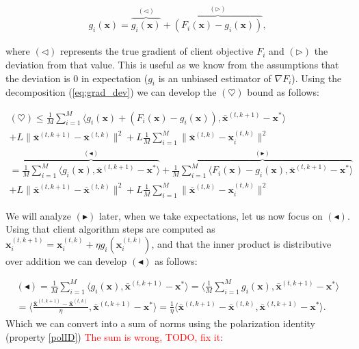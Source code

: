 \begin{align}
    g_i(\bm{x}) = \overbrace{g_i(\bm{x})}^{(\triangleleft)} + \overbrace{\left(F_i(\bm{x}) - g_i(\bm{x}) \right)}^{(\triangleright)},
    \label{eq:grad_dev}
\end{align}

where $(\triangleleft)$ represents the true gradient of client objective $F_i$ and $(\triangleright)$ the deviation from that value. This is useful as we know from the assumptions that the deviation is $0$ in expectation ($g_i$ is an unbiased estimator of $\nabla F_i$). Using the decomposition (\ref{eq:grad_dev}) we can develop the $(\heartsuit)$ bound as follows:

\begin{align*}
    (\heartsuit) \leq \frac{1}{M} \sum_{i=1}^M  \langle g_i(\bm{x})  + \left(F_i(\bm{x}) - g_i(\bm{x}) \right) ,\bar{\bm{x}}^{(t,k+1)} - \bm{x}^{*} \rangle  \\+ L  \|\bar{\bm{x}}^{(t,k+1)}-\bar{\bm{x}}^{(t,k)} \|^2  +L \frac{1}{M} \sum_{i=1}^M \|\bar{\bm{x}}^{(t,k)}-\bm{x}_i^{(t,k)} \|^2 \\
    = \overbrace{\frac{1}{M} \sum_{i=1}^M  \langle g_i(\bm{x})  ,\bar{\bm{x}}^{(t,k+1)} - \bm{x}^{*} \rangle  }^{(\blacktriangleleft)}
    + \overbrace{\frac{1}{M} \sum_{i=1}^M  \langle F_i(\bm{x}) - g_i(\bm{x})  ,\bar{\bm{x}}^{(t,k+1)} - \bm{x}^{*} \rangle  }^{(\blacktriangleright)}
    \\+ L  \|\bar{\bm{x}}^{(t,k+1)}-\bar{\bm{x}}^{(t,k)} \|^2  +L \frac{1}{M} \sum_{i=1}^M \|\bar{\bm{x}}^{(t,k)}-\bm{x}_i^{(t,k)} \|^2 
\end{align*}

We will analyze $(\blacktriangleright)$ later, when we take expectations, let us now focus on $(\blacktriangleleft)$. Using that client algorithm steps are computed as $\bm{x}_i^{(t,k+1)} = \bm{x}_i^{(t,k)} + \eta g_i(\bm{x}_i^{(t,k)})$, and that the inner product is distributive over addition we can develop $(\blacktriangleleft)$ as follows:

\begin{align*}
    (\blacktriangleleft) = \frac{1}{M} \sum_{i=1}^M  \langle g_i(\bm{x})  ,\bar{\bm{x}}^{(t,k+1)} - \bm{x}^{*} \rangle =  \langle \frac{1}{M} \sum_{i=1}^M  g_i(\bm{x})  ,\bar{\bm{x}}^{(t,k+1)} - \bm{x}^{*} \rangle \\
    =  \Bigg\langle \frac{\bar{\bm{x}}^{(t,k+1)} - \bar{\bm{x}}^{(t,k)}}{\eta},\bar{\bm{x}}^{(t,k+1)} - \bm{x}^{*} \Bigg\rangle = \frac{1}{\eta} \langle \bar{\bm{x}}^{(t,k+1)} - \bar{\bm{x}}^{(t,k)},\bar{\bm{x}}^{(t,k+1)} - \bm{x}^{*} \rangle.
\end{align*}
\noindent
Which we can convert into a sum of norms using the polarization identity (property \ref{polID}) \textcolor{red}{The sum is wrong, TODO, fix it}:

